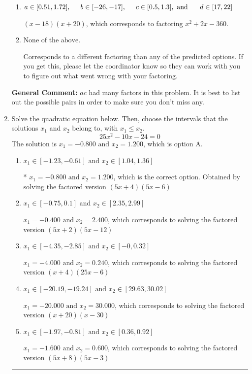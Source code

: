 \documentclass{extbook}[14pt]
\newcommand{\litem}[1]{\item #1

\rule{\textwidth}{0.4pt}}
\begin{document}
\begin{enumerate}
{\begin{enumerate}[label=\Alph*.]
 $(2x -3)(12x + 5)$, which corresponds to associating some factor of c to a.
\item \( a \in [0.51, 1.72], \hspace*{5mm} b \in [-26, -17], \hspace*{5mm} c \in [0.5, 1.3], \text{ and } \hspace*{5mm} d \in [17, 22] \)

 $(x -18)(x + 20)$, which corresponds to factoring $x^{2} +2 x -360$.
\item \( \text{None of the above.} \)

 Corresponds to a different factoring than any of the predicted options. If you get this, please let the coordinator know so they can work with you to figure out what went wrong with your factoring.
\end{enumerate}

\textbf{General Comment:} $ac$ had many factors in this problem. It is best to list out the possible pairs in order to make sure you don't miss any.
}
\litem{
Solve the quadratic equation below. Then, choose the intervals that the solutions $x_1$ and $x_2$ belong to, with $x_1 \leq x_2$.
\[ 25x^{2} -10 x -24 = 0 \]The solution is \( x_1 = -0.800 \text{ and } x_2 = 1.200 \), which is option A.\begin{enumerate}[label=\Alph*.]
\item \( x_1 \in [-1.23, -0.61] \text{ and } x_2 \in [1.04, 1.36] \)

* $x_1 = -0.800 \text{ and } x_2 = 1.200$, which is the correct option. Obtained by solving the factored version $(5x + 4)(5x -6)$
\item \( x_1 \in [-0.75, 0.1] \text{ and } x_2 \in [2.35, 2.99] \)

$x_1 = -0.400 \text{ and } x_2 = 2.400$, which corresponds to solving the factored version $(5x + 2)(5x -12)$
\item \( x_1 \in [-4.35, -2.85] \text{ and } x_2 \in [-0, 0.32] \)

$x_1 = -4.000 \text{ and } x_2 = 0.240$, which corresponds to solving the factored version $(x + 4)(25x -6)$
\item \( x_1 \in [-20.19, -19.24] \text{ and } x_2 \in [29.63, 30.02] \)

$x_1 = -20.000 \text{ and } x_2 = 30.000$, which corresponds to solving the factored version $(x + 20)(x -30)$
\item \( x_1 \in [-1.97, -0.81] \text{ and } x_2 \in [0.36, 0.92] \)

$x_1 = -1.600 \text{ and } x_2 = 0.600$, which corresponds to solving the factored version $(5x + 8)(5x -3)$
\end{enumerate}

}
\end{enumerate}
\end{document}

